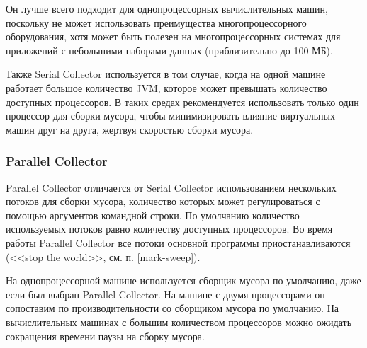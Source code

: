 Он лучше всего подходит для однопроцессорных вычислительных машин, поскольку не может использовать преимущества многопроцессорного оборудования, хотя может быть полезен на многопроцессорных системах для приложений с небольшими наборами данных (приблизительно до 100 МБ). \cite{java_21_available_collectors}

Также Serial Collector используется в том случае, когда на одной машине работает большое количество JVM, которое может превышать количество доступных процессоров. В таких средах рекомендуется использовать только один процессор для сборки мусора, чтобы минимизировать влияние виртуальных машин друг на друга, жертвуя скоростью сборки мусора. \cite{java_gc_basics}



\clearpage
\subsubsection{Parallel Collector}

Parallel Collector отличается от Serial Collector использованием нескольких потоков для сборки мусора, количество которых может регулироваться с помощью аргументов командной строки. \cite{java_21_available_collectors} По умолчанию количество используемых потоков равно количеству доступных процессоров. \cite{java_gc_basics}
Во время работы Parallel Collector все потоки основной программы приостанавливаются (<<stop the world>>, см. п. \ref{mark-sweep}). \cite{java_jrockit_memory}

На однопроцессорной машине используется сборщик мусора по умолчанию, даже если был выбран Parallel Collector. На машине с двумя процессорами он сопоставим по производительности со сборщиком мусора по умолчанию. На вычислительных машинах с большим количеством процессоров можно ожидать сокращения времени паузы на сборку мусора. \cite{java_gc_basics}

